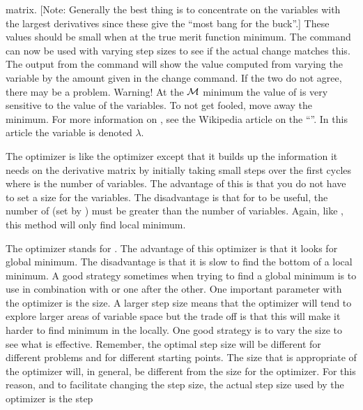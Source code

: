 {{{{{{{{\begin{description}
{matrix. [Note: Generally the best thing is to concentrate on the variables with the largest
derivatives since these give the ``most bang for the buck''.] These values should be small when at
the true merit function minimum. The  command can now be used with varying step
sizes to see if the actual  change matches this. The output from the
 command will show the  value computed from varying the variable by
the amount given in the change command. If the two do not agree, there may be a problem. Warning! At
the $\cal M$ minimum the value of  is very sensitive to the value of the
variables. To not get fooled, move away the minimum. For more information on , see the
Wikipedia article on the ``''. In this article the variable is
denoted $\lambda$.
  \item{} \Newline
The  optimizer is like the  optimizer except that it builds up the information it
needs on the derivative matrix by initially taking small steps over the first  cycles where
 is the number of variables. The advantage of this is that you do not have to set a 
size for the variables. The disadvantage is that for  to be useful, the number of
 (set by ) must be greater than the number of
variables. Again, like , this method will only find local minimum.
  \item{} \Newline
The  optimizer stands for \cite{b:de}. The advantage of this
optimizer is that it looks for global minimum. The disadvantage is that it is slow to find the
bottom of a local minimum. A good strategy sometimes when trying to find a global minimum is to use
 in combination with  or  one after the other. One important parameter with
the  optimizer is the  size. A larger step size means that the optimizer will tend
to explore larger areas of variable space but the trade off is that this will make it harder to find
minimum in the locally. One good strategy is to vary the  size to see what is
effective. Remember, the optimal step size will be different for different problems and for
different starting points. The  size that is appropriate of the  optimizer will, in
general, be different from the  size for the  optimizer. For this reason, and to
facilitate changing the step size, the actual step size used by the  optimizer is the step
}
\end{description}}}}}}}}}
